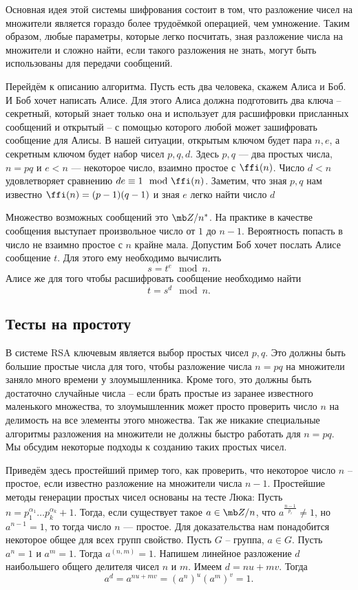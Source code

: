 Основная идея этой системы шифрования состоит в том, что разложение  чисел на множители является гораздо более трудоёмкой операцией, чем  умножение. Таким образом, любые параметры, которые легко посчитать, зная разложение числа на множители и сложно найти, если такого разложения не знать, могут быть использованы для передачи сообщений.

Перейдём к описанию алгоритма. Пусть есть два человека, скажем Алиса и Боб. И Боб хочет написать Алисе. Для этого Алиса должна подготовить два ключа --  секретный, который знает только она и использует для расшифровки присланных сообщений и открытый -- с помощью которого любой может зашифровать сообщение для Алисы. В нашей ситуации, открытым ключом будет пара $n,e$, а секретным ключом будет набор чисел $p,q,d$. Здесь $p,q$ --- два простых числа, $n=pq$  и  $e<n$ --- некоторое число, взаимно простое с $\ffi(n)$. Число $d<n$ удовлетворяет сравнению $de\equiv 1\mod \ffi(n)$. Заметим, что зная $p,q$ нам известно $\ffi(n)=(p-1)(q-1)$ и зная $e$ легко найти число $d$

Множество возможных сообщений это $\mb Z/n^*$. На практике в качестве сообщения выступает произвольное число от $1$ до $n-1$. Вероятность попасть в число не взаимно простое с $n$ крайне мала.  Допустим Боб хочет послать Алисе сообщение $t$. Для этого ему необходимо вычислить 
$$s=t^e\mod n.$$
Алисе же для того чтобы расшифровать сообщение необходимо найти
$$t=s^d \mod n.$$



\subsection{Тесты на простоту}
В системе RSA ключевым является выбор простых чисел $p,q$. Это должны быть большие простые числа для того, чтобы разложение числа $n=pq$ на множители заняло много времени у злоумышленника. Кроме того, это должны быть достаточно случайные числа -- если брать простые из заранее известного маленького множества, то злоумышленник может просто проверить число $n$ на делимость на все элементы этого множества. Так же никакие специальные алгоритмы разложения на множители не должны быстро работать для $n=pq$. Мы обсудим некоторые подходы к созданию таких простых чисел.

Приведём здесь простейший пример того, как проверить, что некоторое число $n$ -- простое, если известно разложение на множители числа $n-1$. Простейшие методы генерации простых чисел основаны на тесте Люка:
 Пусть $n=p_1^{\alpha_1}\dots p_k^{\alpha_k}+1$. Тогда, если существует такое  $a\in \mb Z/n$, что $a^{\frac{n-1}{p_i}}\neq 1 $, но $a^{n-1} = 1$, то тогда число $n$ --- простое.
\ethrm  
Для доказательства нам понадобится некоторое общее для всех групп свойство.
\lm Пусть $G$ -- группа, $a\in G$. Пусть $a^n=1$ и $a^m=1$. Тогда $a^{(n,m)}=1$. 
\elm
\proof Напишем линейное разложение $d$ наибольшего общего делителя чисел $n$  и $m$. Имеем $d=nu+mv$. Тогда
$$a^d= a^{nu+mv}=(a^n)^u (a^m)^v=1.$$
\endproof

